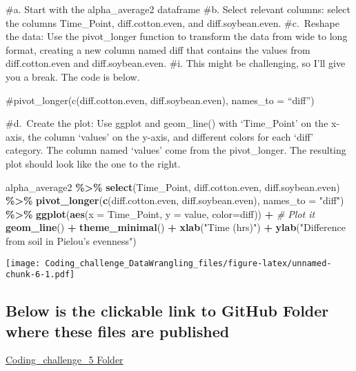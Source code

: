 \documentclass[
]{article}
\newenvironment{Shaded}{\begin{snugshade}}{\end{snugshade}}
\newcommand{\AttributeTok}[1]{\textcolor[rgb]{0.13,0.29,0.53}{#1}}
\newcommand{\CommentTok}[1]{\textcolor[rgb]{0.56,0.35,0.01}{\textit{#1}}}
\newcommand{\FunctionTok}[1]{\textcolor[rgb]{0.13,0.29,0.53}{\textbf{#1}}}
\newcommand{\NormalTok}[1]{#1}
\newcommand{\SpecialCharTok}[1]{\textcolor[rgb]{0.81,0.36,0.00}{\textbf{#1}}}
\newcommand{\StringTok}[1]{\textcolor[rgb]{0.31,0.60,0.02}{#1}}
\begin{document}
\#a. Start with the alpha\_average2 dataframe \#b. Select relevant
columns: select the columns Time\_Point, diff.cotton.even, and
diff.soybean.even. \#c.~Reshape the data: Use the pivot\_longer function
to transform the data from wide to long format, creating a new column
named diff that contains the values from diff.cotton.even and
diff.soybean.even. \#i. This might be challenging, so I'll give you a
break. The code is below.

\#pivot\_longer(c(diff.cotton.even, diff.soybean.even), names\_to =
``diff'')

\#d.~Create the plot: Use ggplot and geom\_line() with `Time\_Point' on
the x-axis, the column `values' on the y-axis, and different colors for
each `diff' category. The column named `values' come from the
pivot\_longer. The resulting plot should look like the one to the right.

\begin{Shaded}
\begin{Highlighting}[]
\NormalTok{alpha\_average2 }\SpecialCharTok{\%\textgreater{}\%}
  \FunctionTok{select}\NormalTok{(Time\_Point, diff.cotton.even, diff.soybean.even) }\SpecialCharTok{\%\textgreater{}\%}
  \FunctionTok{pivot\_longer}\NormalTok{(}\FunctionTok{c}\NormalTok{(diff.cotton.even, diff.soybean.even), }\AttributeTok{names\_to =} \StringTok{"diff"}\NormalTok{) }\SpecialCharTok{\%\textgreater{}\%}
  \FunctionTok{ggplot}\NormalTok{(}\FunctionTok{aes}\NormalTok{(}\AttributeTok{x =}\NormalTok{ Time\_Point, }\AttributeTok{y =}\NormalTok{ value, }\AttributeTok{color=}\NormalTok{diff)) }\SpecialCharTok{+} \CommentTok{\# Plot it }
  \FunctionTok{geom\_line}\NormalTok{() }\SpecialCharTok{+}
  \FunctionTok{theme\_minimal}\NormalTok{() }\SpecialCharTok{+}
  \FunctionTok{xlab}\NormalTok{(}\StringTok{"Time (hrs)"}\NormalTok{) }\SpecialCharTok{+}
  \FunctionTok{ylab}\NormalTok{(}\StringTok{"Difference from soil in Pielou’s evenness"}\NormalTok{)}
\end{Highlighting}
\end{Shaded}

\texttt{[image: Coding\_challenge\_DataWrangling\_files/figure-latex/unnamed-chunk-6-1.pdf]}

\subsection{Below is the clickable link to GitHub Folder where these
files are
published}\label{below-is-the-clickable-link-to-github-folder-where-these-files-are-published}

\href{https://github.com/ppg0001/PLPA_Assignment/tree/main/Coding_challenge_5}{Coding\_challenge\_5
Folder}
\end{document}
